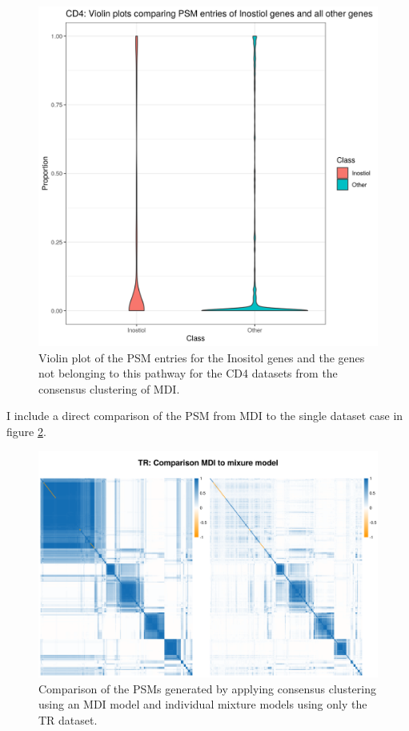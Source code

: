 \documentclass[12pt]{article} %
\begin{document}
\begin{figure}[h]
	\centering
	\includegraphics[scale=0.75]{Images/Biology_data/Set_250/All_datasets/PSM_densities/KEGG_INOSITOL_PHOSPHATE_METABOLISM/CD4.png}
	\caption{Violin plot of the PSM entries for the Inositol genes and the genes not belonging to this pathway for the CD4 datasets from the consensus clustering of MDI.}
	\label{fig:results:cedar_1:mdi_cd4_inostiol_psm_violin}
\end{figure}
	
	I include a direct comparison of the PSM from MDI to the single dataset case in figure \ref{fig:results:cedar_1:mdi_mixture_model_comp_tr}.
	
	
	\begin{figure} %
		\centering
		\includegraphics[scale=0.75]{Images/Biology_data/Set_250/Comparison_mdi_mixture_model/TR_comparison_all_specific_sim.png}
		\caption{Comparison of the PSMs generated by applying consensus clustering using an MDI model and individual mixture models using only the TR dataset.}
		\label{fig:results:cedar_1:mdi_mixture_model_comp_tr}
	\end{figure}
	
\end{document}
